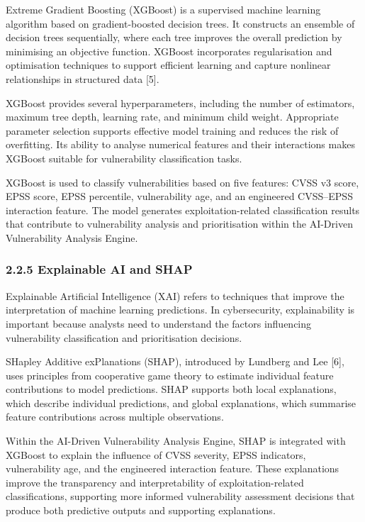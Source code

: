\documentclass[
]{article}
\begin{document}
Extreme Gradient Boosting (XGBoost) is a supervised machine learning
algorithm based on gradient-boosted decision trees. It constructs an
ensemble of decision trees sequentially, where each tree improves the
overall prediction by minimising an objective function. XGBoost
incorporates regularisation and optimisation techniques to support
efficient learning and capture nonlinear relationships in structured
data {[}5{]}.

XGBoost provides several hyperparameters, including the number of
estimators, maximum tree depth, learning rate, and minimum child weight.
Appropriate parameter selection supports effective model training and
reduces the risk of overfitting. Its ability to analyse numerical
features and their interactions makes XGBoost suitable for vulnerability
classification tasks.

XGBoost is used to classify vulnerabilities based on five features: CVSS
v3 score, EPSS score, EPSS percentile, vulnerability age, and an
engineered CVSS--EPSS interaction feature. The model generates
exploitation-related classification results that contribute to
vulnerability analysis and prioritisation within the AI-Driven
Vulnerability Analysis Engine.

\hypertarget{explainable-ai-and-shap}{%
\subsubsection{2.2.5 Explainable AI and
SHAP}\label{explainable-ai-and-shap}}

Explainable Artificial Intelligence (XAI) refers to techniques that
improve the interpretation of machine learning predictions. In
cybersecurity, explainability is important because analysts need to
understand the factors influencing vulnerability classification and
prioritisation decisions.

SHapley Additive exPlanations (SHAP), introduced by Lundberg and Lee
{[}6{]}, uses principles from cooperative game theory to estimate
individual feature contributions to model predictions. SHAP supports
both local explanations, which describe individual predictions, and
global explanations, which summarise feature contributions across
multiple observations.

Within the AI-Driven Vulnerability Analysis Engine, SHAP is integrated
with XGBoost to explain the influence of CVSS severity, EPSS indicators,
vulnerability age, and the engineered interaction feature. These
explanations improve the transparency and interpretability of
exploitation-related classifications, supporting more informed
vulnerability assessment decisions that produce both predictive outputs
and supporting explanations.
\end{document}
